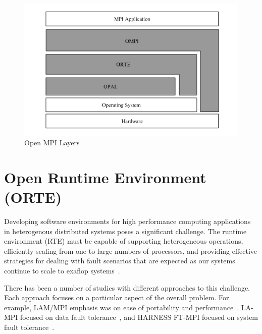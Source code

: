 \begin{figure}[ht]
\centering
\includegraphics[scale=0.45]{images/open-mpi-layers.png}
\caption{Open MPI Layers}
\label{fig:open-mpi-layers}
\end{figure}


\section{Open Runtime Environment (ORTE)}
\label{sec:orte}
Developing software environments for high performance computing applications in heterogenous distributed systems poses a significant challenge. The runtime environment (RTE) must be capable of supporting heterogeneous operations, efficiently scaling from one to large numbers of processors, and providing effective strategies for dealing with fault scenarios that are expected as our systems continue to scale to exaflop systems~\cite{kronstadt2005peta}.

There has been a number of studies with different approaches to this challenge. Each approach focuses on a particular aspect of the overall problem. For example, LAM/MPI emphasis was on ease of portability and performance~\cite{squyres2004component}. LA-MPI focused on data fault tolerance~\cite{aulwes2004architecture}, and HARNESS FT-MPI focused on system fault tolerance~\cite{fagg2002harness}.


